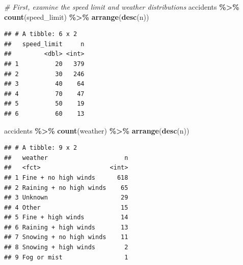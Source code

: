 \documentclass[
]{article}
\newenvironment{Shaded}{\begin{snugshade}}{\end{snugshade}}
\newcommand{\CommentTok}[1]{\textcolor[rgb]{0.56,0.35,0.01}{\textit{#1}}}
\newcommand{\FunctionTok}[1]{\textcolor[rgb]{0.13,0.29,0.53}{\textbf{#1}}}
\newcommand{\NormalTok}[1]{#1}
\newcommand{\SpecialCharTok}[1]{\textcolor[rgb]{0.81,0.36,0.00}{\textbf{#1}}}
\begin{document}
\begin{Shaded}
\begin{Highlighting}[]
\CommentTok{\# First, examine the speed limit and weather distributions}
\NormalTok{accidents }\SpecialCharTok{\%\textgreater{}\%}
  \FunctionTok{count}\NormalTok{(speed\_limit) }\SpecialCharTok{\%\textgreater{}\%}
  \FunctionTok{arrange}\NormalTok{(}\FunctionTok{desc}\NormalTok{(n))}
\end{Highlighting}
\end{Shaded}

\begin{verbatim}
## # A tibble: 6 x 2
##   speed_limit     n
##         <dbl> <int>
## 1          20   379
## 2          30   246
## 3          40    64
## 4          70    47
## 5          50    19
## 6          60    13
\end{verbatim}

\begin{Shaded}
\begin{Highlighting}[]
\NormalTok{accidents }\SpecialCharTok{\%\textgreater{}\%}
  \FunctionTok{count}\NormalTok{(weather) }\SpecialCharTok{\%\textgreater{}\%}
  \FunctionTok{arrange}\NormalTok{(}\FunctionTok{desc}\NormalTok{(n))}
\end{Highlighting}
\end{Shaded}

\begin{verbatim}
## # A tibble: 9 x 2
##   weather                     n
##   <fct>                   <int>
## 1 Fine + no high winds      618
## 2 Raining + no high winds    65
## 3 Unknown                    29
## 4 Other                      15
## 5 Fine + high winds          14
## 6 Raining + high winds       13
## 7 Snowing + no high winds    11
## 8 Snowing + high winds        2
## 9 Fog or mist                 1
\end{verbatim}
\end{document}
